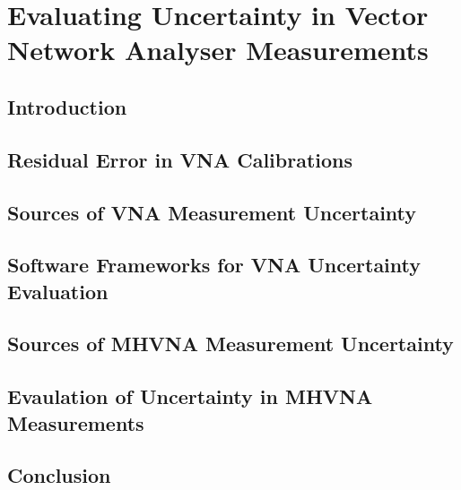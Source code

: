 \documentclass[../thesis.tex]{subfiles}
\begin{document}
\chapter{Evaluating Uncertainty in Vector Network Analyser Measurements}
\section{Introduction}
\section{Residual Error in VNA Calibrations}
\section{Sources of VNA Measurement Uncertainty}
\section{Software Frameworks for VNA Uncertainty Evaluation}
\section{Sources of MHVNA Measurement Uncertainty}
\section{Evaulation of Uncertainty in MHVNA Measurements}
\section{Conclusion}
\end{document}
